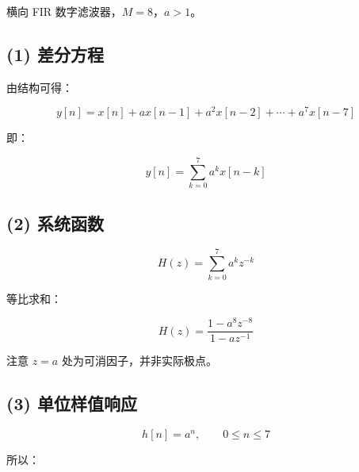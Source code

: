 \documentclass[11pt]{ctexart}
\begin{document}
横向 FIR 数字滤波器，\(M=8\)，\(a>1\)。\par



\subsection*{(1) 差分方程}



由结构可得：\par



\[

y[n]=x[n]+a x[n-1]+a^2x[n-2]+\cdots+a^7x[n-7]

\]



即：\par



\[

y[n]=\sum_{k=0}^{7}a^k x[n-k]

\]



\subsection*{(2) 系统函数}



\[

H(z)=\sum_{k=0}^{7}a^kz^{-k}

\]



等比求和：\par



\[

H(z)=\frac{1-a^8z^{-8}}{1-az^{-1}}

\]



注意 \(z=a\) 处为可消因子，并非实际极点。\par



\subsection*{(3) 单位样值响应}



\[

h[n]=a^n,\qquad 0\le n\le 7

\]



所以：\par
\end{document}
